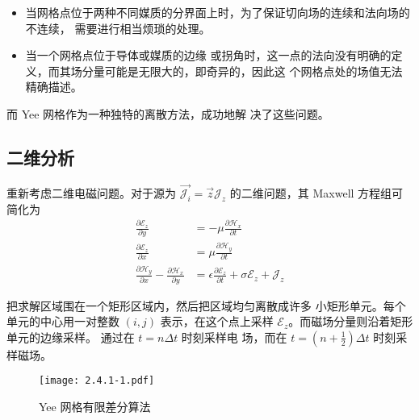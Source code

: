 \begin{itemize}
    \item 当网格点位于两种不同媒质的分界面上时，为了保证切向场的连续和法向场的不连续，
    需要进行相当烦琐的处理。
    \item 当一个网格点位于导体或媒质的边缘
    或拐角时，这一点的法向没有明确的定义，而其场分量可能是无限大的，即奇异的，因此这
    个网格点处的场值无法精确描述。
\end{itemize}

\par 而 Yee 网格作为一种独特的离散方法，成功地解
决了这些问题。

\subsection{二维分析}

\begin{theorem}
    重新考虑二维电磁问题。对于源为 $\vec{\mathscr{J}_i}=\vec{z}\mathscr{J}_z$
    的二维问题，其 Maxwell 方程组可简化为
    \begin{align}
        \label{Yee Maxwell 方程组-1}
        \frac{\partial \mathscr{E}_z}{\partial y}
        &= -\mu \frac{\partial \mathscr{H}_x}{\partial t}\\
        \label{Yee Maxwell 方程组-2}
        \frac{\partial \mathscr{E}_z}{\partial x}
        &= \mu \frac{\partial \mathscr{H}_y}{\partial t}\\
        \label{Yee Maxwell 方程组-3}
        \frac{\partial \mathscr{H}_y}{\partial x}
        -\frac{\partial \mathscr{H}_x}{\partial y}
        &= \epsilon \frac{\partial \mathscr{E}_z}{\partial t}
        +\sigma \mathscr{E}_z + \mathscr{J}_z
    \end{align}
\end{theorem}

\par 把求解区域围在一个矩形区域内，然后把区域均匀离散成许多
小矩形单元。每个单元的中心用一对整数 $(i,j)$ 表示，在这个点上采样
$\mathscr{E}_z$。而磁场分量则沿着矩形单元的边缘采样。
通过在 $t=n\Delta t$ 时刻采样电
场，而在 $t=\left(n+\frac{1}{2}\right)\Delta t$ 时刻采样磁场。

\begin{figure}[!htbp]
    \centering
    \texttt{[image: 2.4.1-1.pdf]}
    \caption{Yee 网格有限差分算法}
\end{figure}

